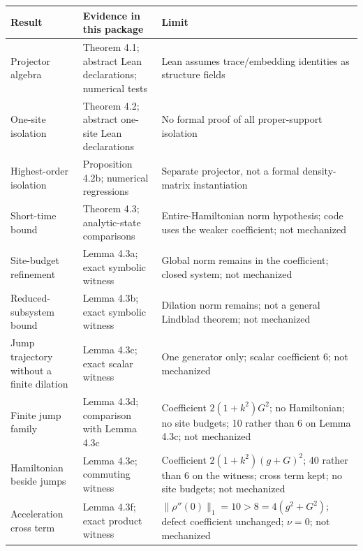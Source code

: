 \documentclass[
  11pt,
]{article}
\begin{document}
\begin{longtable}[]{@{}
  >{\raggedright\arraybackslash}p{}
  >{\raggedright\arraybackslash}p{}
  >{\raggedright\arraybackslash}p{}@{}}
\toprule\noalign{}
\begin{minipage}[b]{\linewidth}\raggedright
Result
\end{minipage} & \begin{minipage}[b]{\linewidth}\raggedright
Evidence in this package
\end{minipage} & \begin{minipage}[b]{\linewidth}\raggedright
Limit
\end{minipage} \\
\midrule\noalign{}
\endhead
\bottomrule\noalign{}
\endlastfoot
Projector algebra & Theorem 4.1; abstract Lean declarations; numerical tests & Lean assumes trace/embedding identities as structure fields \\
One-site isolation & Theorem 4.2; abstract one-site Lean declarations & No formal proof of all proper-support isolation \\
Highest-order isolation & Proposition 4.2b; numerical regressions & Separate projector, not a formal density-matrix instantiation \\
Short-time bound & Theorem 4.3; analytic-state comparisons & Entire-Hamiltonian norm hypothesis; code uses the weaker coefficient; not mechanized \\
Site-budget refinement & Lemma 4.3a; exact symbolic witness & Global norm remains in the coefficient; closed system; not mechanized \\
Reduced-subsystem bound & Lemma 4.3b; exact symbolic witness & Dilation norm remains; not a general Lindblad theorem; not mechanized \\
Jump trajectory without a finite dilation & Lemma 4.3c; exact scalar witness & One generator only; scalar coefficient 6; not mechanized \\
Finite jump family & Lemma 4.3d; comparison with Lemma 4.3c & Coefficient \(2(1+k^2)G^2\); no Hamiltonian; no site budgets; 10 rather than 6 on Lemma 4.3c; not mechanized \\
Hamiltonian beside jumps & Lemma 4.3e; commuting witness & Coefficient \(2(1+k^2)(g+G)^2\); 40 rather than 6 on the witness; cross term kept; no site budgets; not mechanized \\
Acceleration cross term & Lemma 4.3f; exact product witness & \(\|\rho''(0)\|_1=10>8=4(g^2+G^2)\); defect coefficient unchanged; \(\nu=0\); not mechanized \\

\end{longtable}
\end{document}
